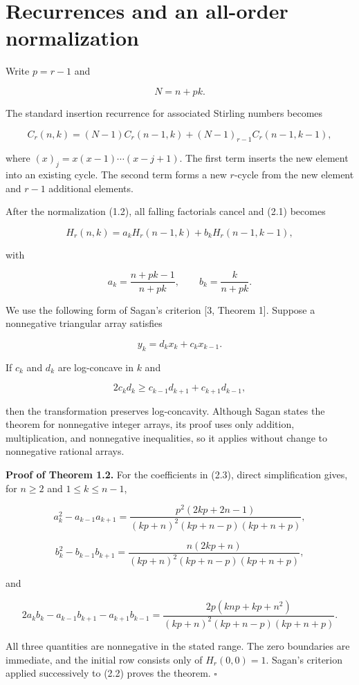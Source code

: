 \documentclass[11pt]{article}
\numberwithin{equation}{section}
\begin{document}
\section{Recurrences and an all-order normalization}


Write $p=r-1$ and

\[
N=n+pk.
\]

The standard insertion recurrence for associated Stirling numbers becomes

\[
C_r(n,k)
=(N-1)C_r(n-1,k)+(N-1)_{r-1}C_r(n-1,k-1),
\tag{2.1}
\]

where $(x)_j=x(x-1)\cdots(x-j+1)$. The first term inserts the new element into an
existing cycle. The second term forms a new $r$-cycle from the new element and $r-1$
additional elements.

After the normalization (1.2), all falling factorials cancel and (2.1) becomes

\[
H_r(n,k)=a_kH_r(n-1,k)+b_kH_r(n-1,k-1),
\tag{2.2}
\]

with

\[
a_k=\frac{n+pk-1}{n+pk},
\qquad
b_k=\frac{k}{n+pk}.
\tag{2.3}
\]

We use the following form of Sagan's criterion [3, Theorem 1]. Suppose a nonnegative
triangular array satisfies

\[
y_k=d_kx_k+c_kx_{k-1}.
\]

If $c_k$ and $d_k$ are log-concave in $k$ and

\[
2c_kd_k\ge c_{k-1}d_{k+1}+c_{k+1}d_{k-1},
\tag{2.4}
\]

then the transformation preserves log-concavity. Although Sagan states the theorem for
nonnegative integer arrays, its proof uses only addition, multiplication, and nonnegative
inequalities, so it applies without change to nonnegative rational arrays.

\textbf{Proof of Theorem 1.2.} For the coefficients in (2.3), direct simplification gives, for
$n\ge2$ and $1\le k\le n-1$,

\[
a_k^2-a_{k-1}a_{k+1}
=\frac{p^2(2kp+2n-1)}{(kp+n)^2(kp+n-p)(kp+n+p)},
\tag{2.5}
\]

\[
b_k^2-b_{k-1}b_{k+1}
=\frac{n(2kp+n)}{(kp+n)^2(kp+n-p)(kp+n+p)},
\tag{2.6}
\]

and

\[
2a_kb_k-a_{k-1}b_{k+1}-a_{k+1}b_{k-1}
=\frac{2p(knp+kp+n^2)}{(kp+n)^2(kp+n-p)(kp+n+p)}.
\tag{2.7}
\]

All three quantities are nonnegative in the stated range. The zero boundaries are immediate,
and the initial row consists only of $H_r(0,0)=1$. Sagan's criterion applied successively to
(2.2) proves the theorem. $\square$
\end{document}
